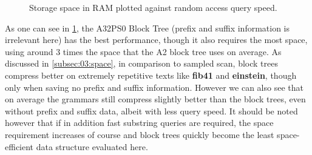 \documentclass{scrartcl}
\begin{document}
\begin{figure}[ht]
	\caption{Storage space in RAM plotted against random access query speed.}
	\label{fig:03:spacetimera}
\end{figure}

As one can see in \cref{fig:03:spacetimera}, the A32PS0 Block Tree (prefix and suffix information is irrelevant here)
has the best performance, though it also requires the most space, using around 3 times the space that the A2 block tree uses on average.
As discussed in \cref{subsec:03:space}, in comparison to sampled scan, block trees compress better on extremely repetitive texts like \textbf{fib41} and \textbf{einstein}, though only when saving no prefix and suffix information.
However we can also see that on average the grammars still compress slightly better than the block trees, even without prefix and suffix data, albeit with less query speed.
It should be noted however that if in addition fast substring queries are required, the space requirement increases of course and block trees quickly become the least space-efficient data structure evaluated here.
\end{document}
